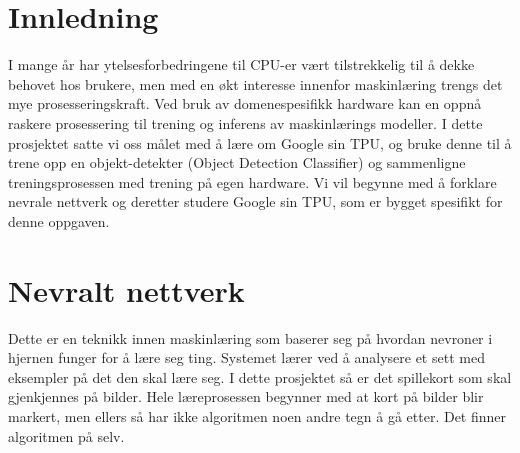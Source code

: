 \begin{titlepage}
	
	
	
	
	 
	
	\vfill %
	
\end{titlepage}
\newpage
\tableofcontents
\newpage

\section{Innledning}
I mange år har ytelsesforbedringene til CPU-er vært tilstrekkelig til å dekke behovet hos brukere, men med en økt interesse innenfor maskinlæring trengs det mye prosesseringskraft. Ved bruk av domenespesifikk hardware kan en oppnå raskere prosessering til trening og inferens av maskinlærings modeller. I dette prosjektet satte vi oss målet med å lære om Google sin TPU, og bruke denne til å trene opp en objekt-detekter (Object Detection Classifier) og sammenligne treningsprosessen med trening på egen hardware. Vi vil begynne med å forklare nevrale nettverk og deretter studere Google sin TPU, som er bygget spesifikt for denne oppgaven. 

\newpage
\section{Nevralt nettverk}
Dette er en teknikk innen maskinlæring som baserer seg på hvordan nevroner i hjernen funger for å lære seg ting. Systemet lærer ved å analysere et sett med eksempler på det den skal lære seg. I dette prosjektet så er det spillekort som skal gjenkjennes på bilder. Hele læreprosessen begynner med at kort på bilder blir markert, men ellers så har ikke algoritmen noen andre tegn å gå etter. Det finner algoritmen på selv.

